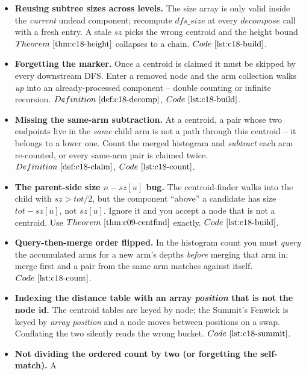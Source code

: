 
\begin{itemize}[nosep, leftmargin=1.4em]
  \item \textbf{Reusing subtree sizes across levels.} The size array is only valid inside the
        \emph{current} undead component; recompute \(\mathit{dfs\_size}\) at every
        \(\mathit{decompose}\) call with a fresh entry. A stale \(\mathit{sz}\) picks the wrong
        centroid and the height bound \(\thmref{c18-height}\) collapses to a chain. \(\coderef{c18-build}\).
  \item \textbf{Forgetting the  marker.} Once a centroid is claimed it must be
        skipped by every downstream DFS. Enter a removed node and the arm collection walks
        \emph{up} into an already-processed component -- double counting or infinite recursion.
        \(\defref{c18-decomp}\), \(\coderef{c18-build}\).
  \item \textbf{Missing the same-arm subtraction.} At a centroid, a pair whose two endpoints
        live in the \emph{same} child arm is not a path through this centroid -- it belongs to a
        lower one. Count the merged histogram and \emph{subtract} each arm re-counted, or every
        same-arm pair is claimed twice. \(\defref{c18-claim}\), \(\coderef{c18-count}\).
  \item \textbf{The parent-side size \(n-\mathit{sz}[u]\) bug.} The centroid-finder walks into
        the child with \(\mathit{sz}> \mathit{tot}/2\), but the component ``above'' a candidate
        has size \(\mathit{tot}-\mathit{sz}[u]\), not \(\mathit{sz}[u]\). Ignore it and you accept
        a node that is not a centroid. Use \(\thmref{c09-centfind}\) exactly. \(\coderef{c18-build}\).
  \item \textbf{Query-then-merge order flipped.} In the histogram count you must \emph{query}
        the accumulated arms for a new arm's depths \emph{before} merging that arm in; merge
        first and a pair from the same arm matches against itself. \(\coderef{c18-count}\).
  \item \textbf{Indexing the distance table with an array \emph{position} that is not the
        node id.} The centroid tables are keyed by node; the Summit's Fenwick is keyed by
        \emph{array position} and a node moves between positions on a swap. Conflating the two
        silently reads the wrong bucket. \(\coderef{c18-summit}\).
  \item \textbf{Not dividing the ordered count by two (or forgetting the self-match).} A

\end{itemize}
